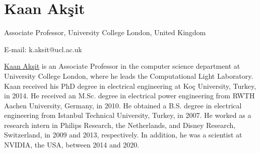 \newpage

\section*{Kaan Akşit}

Associate Professor,
University College London,
United Kingdom

E-mail: k.aksit@ucl.ac.uk

\href{https://kaanaksit.com}{Kaan Akşit} is an Associate Professor in the computer science department at University College London, where he leads the Computational Light Laboratory.
Kaan received his PhD degree in electrical engineering at Koç University, Turkey, in 2014. 
He received an M.Sc. degree in electrical power engineering from RWTH Aachen University, Germany, in 2010.
He obtained a B.S. degree in electrical engineering from Istanbul Technical University, Turkey, in 2007. 
He worked as a research intern in Philips Research, the Netherlands, and Disney Research, Switzerland, in 2009 and 2013, respectively. 
In addition, he was a scientist at NVIDIA, the USA, between 2014 and 2020.
